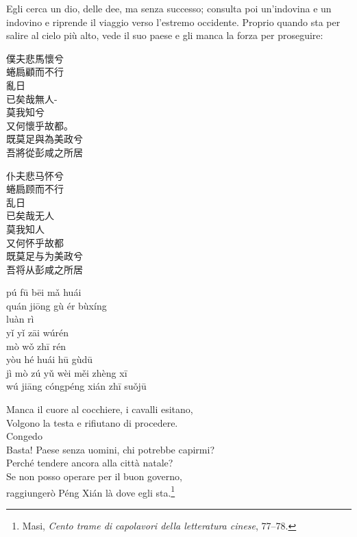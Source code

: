 \documentclass[12pt,titlepage]{article}
\begin{document}
  Egli cerca un dio, delle dee, ma senza successo; consulta poi un'indovina e un indovino e riprende il viaggio verso l'estremo occidente. Proprio quando sta per salire al cielo più alto, vede il suo paese e gli manca la forza per proseguire:
\begin{adjustwidth}{-2cm}{-2cm}
\begin{multicols}{3}
\noindent
 \begin{CJK*}{UTF8}{gbsn}
 僕夫悲馬懷兮\\
 蜷扃顧而不行\\
 亂日\\
 已矣哉無人-\\
 莫我知兮\\
 又何懷乎故都。\\
 既莫足與為美政兮 \\
吾將從彭咸之所居\\\footnotemark
\end{CJK*}

\columnbreak
\noindent
 \begin{CJK*}{UTF8}{gbsn}
仆夫悲马怀兮\\
 蜷扃顾而不行\\
 乱日\\
已矣哉无人\\
莫我知人\\
 又何怀乎故都\\
既莫足与为美政兮 \\
吾将从彭咸之所居\\
\end{CJK*}

\columnbreak
\noindent
pú fū bēi mǎ huái \\
quán jiōng gù ér bùxíng\\
luàn rì	\\
yǐ yǐ zāi wúrén	\\
mò wǒ zhī rén	\\
yòu hé huái hū gùdū\\
jì mò zú yǔ wèi měi zhèng xī\\
wú jiāng cóngpéng xián zhī suǒjū\\
\end{multicols}
\end{adjustwidth}
%
%
%
\begin{center}
Manca il cuore al cocchiere, i cavalli esitano,\\
Volgono la testa e rifiutano di procedere.\\
Congedo\\
Basta! Paese senza uomini, chi potrebbe capirmi?\\
Perché tendere ancora alla città natale?\\
Se non posso operare per il buon governo,\\
raggiungerò Péng Xián là dove egli sta.\footnote{Masi, \emph{Cento trame di capolavori della letteratura cinese}, 77–78.}\\
\end{center}
\end{document}
